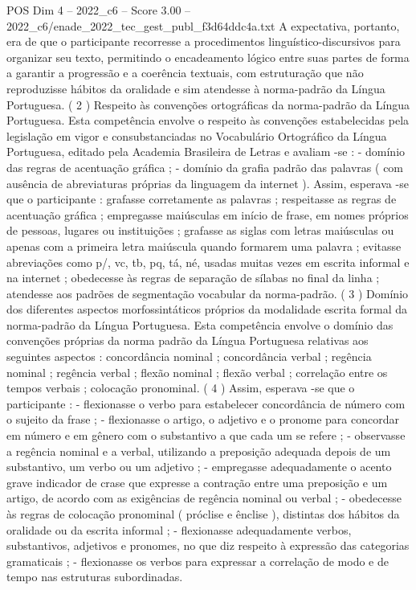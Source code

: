\begin{textsample}{POS Dim 4 – 2022\_c6 – Score 3.00 – 2022\_c6/enade\_2022\_tec\_gest\_publ\_f3d64ddc4a.txt}
A expectativa, portanto, era de que o participante recorresse a procedimentos linguístico-discursivos para organizar seu texto, permitindo o encadeamento lógico entre suas partes de forma a garantir a progressão e a coerência textuais, com estruturação que não reproduzisse hábitos da oralidade e sim atendesse à norma-padrão da Língua Portuguesa. ( 2 ) Respeito às convenções ortográficas da norma-padrão da Língua Portuguesa.
Esta competência envolve o respeito às convenções estabelecidas pela legislação em vigor e consubstanciadas no Vocabulário Ortográfico da Língua Portuguesa, editado pela Academia Brasileira de Letras e avaliam -se : - domínio das regras de acentuação gráfica ; - domínio da grafia padrão das palavras ( com ausência de abreviaturas próprias da linguagem da internet ).
Assim, esperava -se que o participante : grafasse corretamente as palavras ; respeitasse as regras de acentuação gráfica ; empregasse maiúsculas em início de frase, em nomes próprios de pessoas, lugares ou instituições ; grafasse as siglas com letras maiúsculas ou apenas com a primeira letra maiúscula quando formarem uma palavra ; evitasse abreviações como p/, vc, tb, pq, tá, né, usadas muitas vezes em escrita informal e na internet ; obedecesse às regras de separação de sílabas no final da linha ; atendesse aos padrões de segmentação vocabular da norma-padrão. ( 3 ) Domínio dos diferentes aspectos morfossintáticos próprios da modalidade escrita formal da norma-padrão da Língua Portuguesa.
Esta competência envolve o domínio das convenções próprias da norma padrão da Língua Portuguesa relativas aos seguintes aspectos : concordância nominal ; concordância verbal ; regência nominal ; regência verbal ; flexão nominal ; flexão verbal ; correlação entre os tempos verbais ; colocação pronominal. ( 4 ) Assim, esperava -se que o participante : - flexionasse o verbo para estabelecer concordância de número com o sujeito da frase ; - flexionasse o artigo, o adjetivo e o pronome para concordar em número e em gênero com o substantivo a que cada um se refere ; - observasse a regência nominal e a verbal, utilizando a preposição adequada depois de um substantivo, um verbo ou um adjetivo ; - empregasse adequadamente o acento grave indicador de crase que expresse a contração entre uma preposição e um artigo, de acordo com as exigências de regência nominal ou verbal ; - obedecesse às regras de colocação pronominal ( próclise e ênclise ), distintas dos hábitos da oralidade ou da escrita informal ; - flexionasse adequadamente verbos, substantivos, adjetivos e pronomes, no que diz respeito à expressão das categorias gramaticais ; - flexionasse os verbos para expressar a correlação de modo e de tempo nas estruturas subordinadas.

\end{textsample}
